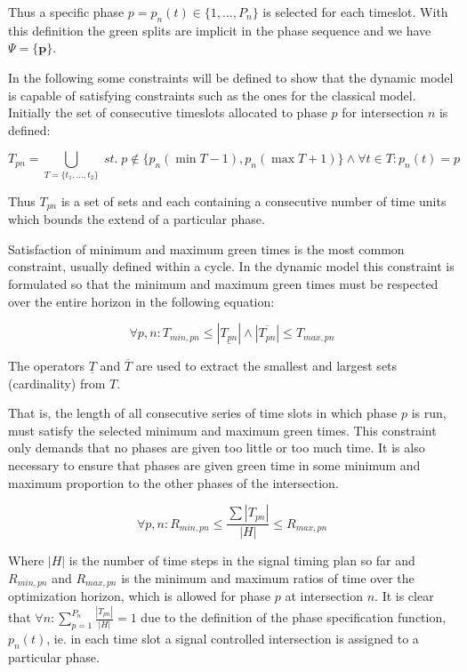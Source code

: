 Thus a specific phase $p = p_n(t) \in \lbrace 1,...,P_n \rbrace$ is selected for each timeslot. With this definition the green splits are implicit in the phase sequence and we have $\Psi = \lbrace \textbf{p} \rbrace $.

In the following some constraints will be defined to show that the dynamic model is capable of satisfying constraints such as the ones for the classical model. Initially the set of consecutive timeslots allocated to phase $p$ for intersection $n$ is defined:

\begin{equation}
T_{pn} = \bigcup_{T = \lbrace t_1,...,t_2 \rbrace} \; st. \; p \not \in \lbrace p_n(\min T - 1), p_n(\max T + 1) \rbrace \wedge\forall t \in T: p_n(t) = p 
\end{equation}

Thus $T_{pn}$ is a set of sets and each containing a consecutive number of time units which bounds the extend of a particular phase.

Satisfaction of minimum and maximum green times is the most common constraint, usually defined within a cycle. In the dynamic model this constraint is formulated so that the minimum and maximum green times must be respected over the entire horizon in the following equation:

\begin{equation}
\label{eqn:minmaxtimes}
\forall p,n : T_{min,pn} \leq |\underline{T_{pn}}| \wedge |\overline{T_{pn}}| \leq T_{max,pn} 
\end{equation}

The operators $\underline{T}$ and $\overline{T}$ are used to extract the smallest and largest sets (cardinality) from $T$.

That is, the length of all consecutive series of time slots in which phase $p$ is run, must satisfy the selected minimum and maximum green times. This constraint only demands that no phases are given too little or too much time. It is also necessary to ensure that phases are given green time in some minimum and maximum proportion to the other phases of the intersection.

\begin{equation}
\label{eqn:proportions}
\forall p,n : R_{min,pn} \leq \frac{\sum |T_{pn}|}{|H|} \leq R_{max,pn}
\end{equation}

Where $|H|$ is the number of time steps in the signal timing plan so far and $R_{min,pn}$ and $R_{max,pn}$ is the minimum and maximum ratios of time over the optimization horizon, which is allowed for phase $p$ at intersection $n$. It is clear that $\forall n : \displaystyle\sum_{p=1}^{P_n}\frac{|T_{pn}|}{|H|} = 1$ due to the definition of the phase specification function, $p_n(t)$,  ie. in each time slot a signal controlled intersection is assigned to a particular phase.


